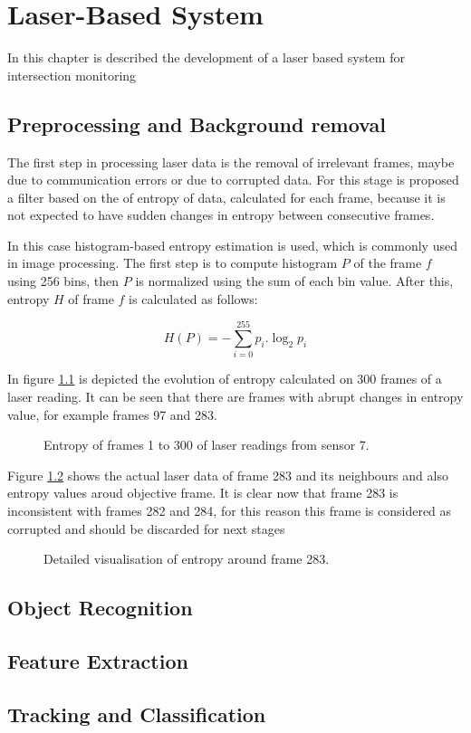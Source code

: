 
\chapter{Laser-Based System}

In this chapter is described the development of a laser based system for intersection monitoring

\section{Preprocessing and Background removal}

The first step in processing laser data is the removal of irrelevant frames, maybe due to communication errors or due to corrupted data. For this stage is proposed a filter based on the of entropy of data, calculated for each frame, because it is not expected to have sudden changes in entropy between consecutive frames. 

In this case histogram-based entropy estimation is used, which is commonly used in image processing. The first step is to compute histogram $P$ of the frame $f$ using 256 bins, then $P$ is normalized using the sum of each bin value. After this, entropy $H$ of frame $f$ is calculated as follows:

\begin{equation}
 H(P)=-\sum_{i=0}^{255}{ p_i.\log_{2}{p_i}} 
\end{equation}

In figure \ref{entropy_frames} is depicted the evolution of entropy calculated on 300 frames of a laser reading. It can be seen that there are frames with abrupt changes in entropy value, for example frames 97 and 283.

\begin{figure}[ht!]
\centering

\caption{Entropy of frames 1 to 300 of laser readings from sensor 7.}
\label{entropy_frames}
\end{figure}

Figure \ref{l7-f283} shows the actual laser data of frame 283 and its neighbours and also entropy values aroud objective frame. It is clear now that frame 283 is inconsistent with frames 282 and 284, for this reason this frame is considered as corrupted and should be discarded for next stages

\begin{figure}[ht!]
\centering

\caption{Detailed visualisation of entropy around frame 283.}
\label{l7-f283}
\end{figure}



\section{Object Recognition}
\section{Feature Extraction}
\section{Tracking and Classification}
